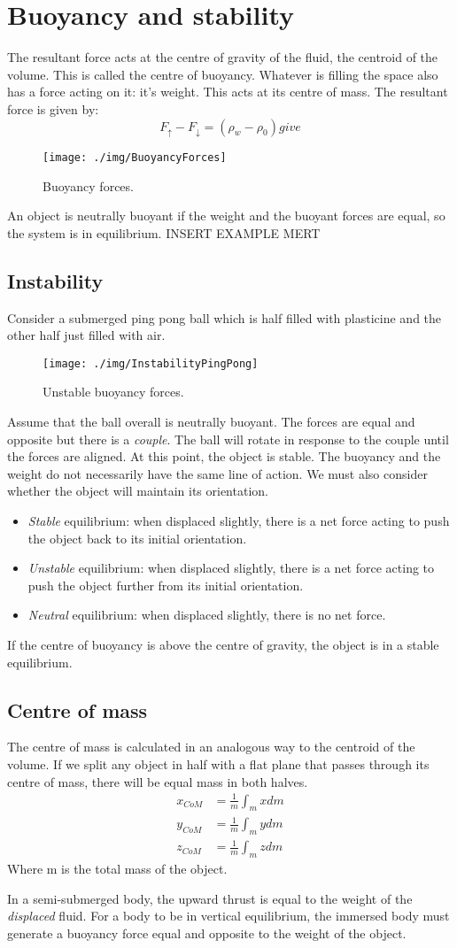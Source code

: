 \section{Buoyancy and stability}
The resultant force acts at the centre of gravity of the fluid, the centroid of the volume. This is called the centre of buoyancy. Whatever is filling the space also has a force acting on it: it's weight. This acts at its centre of mass. The resultant force is given by:
\begin{equation}
  F_\uparrow - F_\downarrow = (\rho_w - \rho_0) give
\end{equation}
\begin{figure}[h!]
  \centering
  \texttt{[image: ./img/BuoyancyForces]}
  \caption{Buoyancy forces.}
\end{figure}
An object is neutrally buoyant if the weight and the buoyant forces are equal, so the system is in equilibrium. INSERT EXAMPLE MERT
\subsection{Instability}
Consider a submerged ping pong ball which is half filled with plasticine and the other half just filled with air.
\begin{figure}[h!]
  \centering
  \texttt{[image: ./img/InstabilityPingPong]}
  \caption{Unstable buoyancy forces.}
\end{figure}
Assume that the ball overall is neutrally buoyant. The forces are equal and opposite but there is a \emph{couple}. The ball will rotate in response to the couple until the forces are aligned. At this point, the object is stable. The buoyancy and the weight do not necessarily have the same line of action. We must also consider whether the object will maintain its orientation.
\begin{itemize}
  \item \emph{Stable} equilibrium: when displaced slightly, there is a net force acting to push the object back to its initial orientation.
  \item \emph{Unstable} equilibrium: when displaced slightly, there is a net force acting to push the object further from its initial orientation.
  \item \emph{Neutral} equilibrium: when displaced slightly, there is no net force.
\end{itemize}
If the centre of buoyancy is above the centre of gravity, the object is in a stable equilibrium.
\subsection{Centre of mass}
The centre of mass is calculated in an analogous way to the centroid of the volume. If we split any object in half with a flat plane that passes through its centre of mass, there will be equal mass in both halves.
\begin{align}
  x_{CoM} & = \frac{1}{m}\int_m x dm \\
  y_{CoM} & = \frac{1}{m}\int_m y dm \\
  z_{CoM} & = \frac{1}{m}\int_m z dm
\end{align}
Where m is the total mass of the object.

In a semi-submerged body, the upward thrust is equal to the weight of the \emph{displaced} fluid. For a body to be in vertical equilibrium, the immersed body must generate a buoyancy force equal and opposite to the weight of the object.